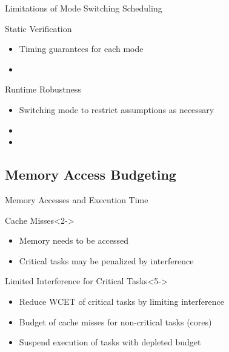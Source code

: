 \begin{frame}{Limitations of Mode Switching Scheduling}

\pause
\begin{block}{Static Verification}
\begin{itemize}
    \item<3-> Timing guarantees for each mode
    \item<4-> 
\end{itemize}
\end{block}

\begin{block}{Runtime Robustness}
\begin{itemize}
    \item<5-> Switching mode to restrict assumptions as necessary
    \item<6-> 
    \item<7-> 
\end{itemize}
\end{block}

\end{frame}


\subsection{Memory Access Budgeting}

\begin{frame}{Memory Accesses and Execution Time}

\begin{block}{Cache Misses}<2->
\begin{itemize}
    \item<3-> Memory needs to be accessed
    \item<4-> Critical tasks may be penalized by interference
\end{itemize}
\end{block}

\begin{block}{Limited Interference for Critical Tasks}<5->
\begin{itemize}
    \item<6-> Reduce WCET of critical tasks by limiting interference
    \item<7-> Budget of cache misses for non-critical tasks (cores)
    \item<8-> Suspend execution of tasks with depleted budget
\end{itemize}
\end{block}

\vfill


\end{frame}


